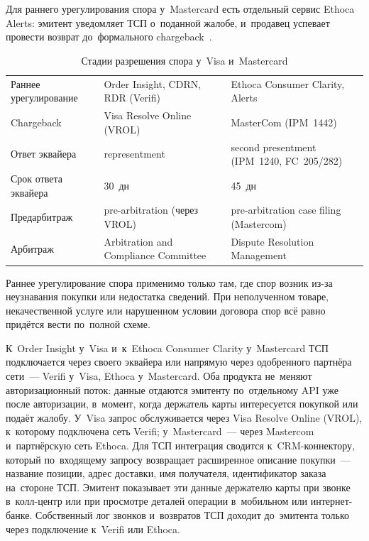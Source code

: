 Для раннего урегулирования спора у~Mastercard есть отдельный сервис Ethoca Alerts:
эмитент уведомляет ТСП о~поданной жалобе, и~продавец успевает провести возврат
до~формального chargeback~\cite{mc-dispute-management}.

\begin{table}[tbp]
  \caption{Стадии разрешения спора у~Visa и~Mastercard}\label{tab:vcr-vs-mc-flow}
  \begingroup
  \tablesetup
  \begin{tabularx}{\textwidth}{@{}B{0.2\textwidth} Y Y@{}}
    \toprule
    \headrow
     &  &  \\
    \midrule
    Раннее урегулирование & Order Insight, CDRN, RDR (Verifi) &
    Ethoca Consumer Clarity, Alerts \\
    \rowsep
    Chargeback & Visa Resolve Online (VROL) & MasterCom (IPM~1442) \\
    \rowsep
    Ответ эквайера & representment & second presentment (IPM~1240, FC~205/282) \\
    \rowsep
    Срок ответа эквайера & 30~дн & 45~дн \\
    \rowsep
    Предарбитраж & pre-arbitration (через VROL) &
    pre-arbitration case filing (Mastercom) \\
    \rowsep
    Арбитраж & Arbitration and Compliance Committee & Dispute Resolution Management \\
    \bottomrule
  \end{tabularx}\par
  \endgroup
\end{table}

Раннее урегулирование спора применимо только там, где спор возник из-за неузнавания
покупки или недостатка сведений. При неполученном товаре, некачественной услуге или
нарушенном условии договора спор всё равно придётся вести по~полной схеме.

К~Order Insight у~Visa и~к~Ethoca Consumer Clarity у~Mastercard ТСП
подключается через своего эквайера или напрямую через одобренного партнёра
сети~--- Verifi у~Visa, Ethoca у~Mastercard. Оба продукта не~меняют
авторизационный поток: данные отдаются эмитенту по~отдельному API уже после
авторизации, в~момент, когда держатель карты интересуется покупкой или подаёт
жалобу. У~Visa запрос обслуживается через Visa Resolve Online (VROL),
к~которому подключена сеть Verifi; у~Mastercard~--- через Mastercom
и~партнёрскую сеть Ethoca. Для ТСП интеграция сводится к~CRM-коннектору,
который по~входящему запросу возвращает расширенное описание
покупки~--- название позиции, адрес доставки, имя получателя, идентификатор
заказа на~стороне ТСП. Эмитент показывает эти данные держателю карты при звонке
в~колл-центр или при просмотре деталей операции в~мобильном или интернет-банке.
Собственный лог звонков и~возвратов ТСП доходит до~эмитента только через
подключение к~Verifi или Ethoca. \FloatBarrier

